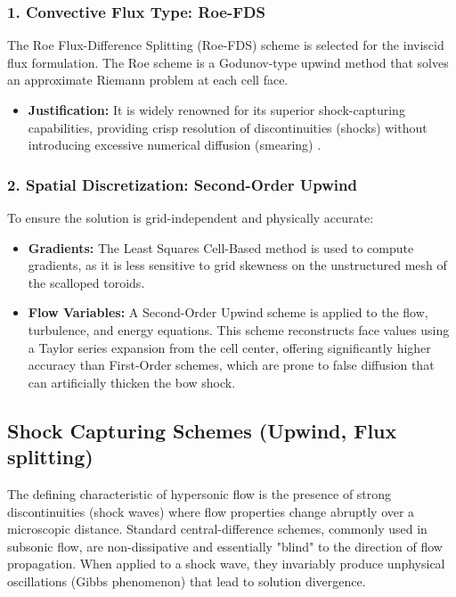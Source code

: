 \subsubsection*{1. Convective Flux Type: Roe-FDS}
The Roe Flux-Difference Splitting (Roe-FDS) scheme is selected for the inviscid flux formulation. The Roe scheme is a Godunov-type upwind method that solves an approximate Riemann problem at each cell face.
\begin{itemize}
    \item \textbf{Justification:} It is widely renowned for its superior shock-capturing capabilities, providing crisp resolution of discontinuities (shocks) without introducing excessive numerical diffusion (smearing) \cite{versteeg2007cfd}.
\end{itemize}

\subsubsection*{2. Spatial Discretization: Second-Order Upwind}
To ensure the solution is grid-independent and physically accurate:
\begin{itemize}
    \item \textbf{Gradients:} The Least Squares Cell-Based method is used to compute gradients, as it is less sensitive to grid skewness on the unstructured mesh of the scalloped toroids.
    \item \textbf{Flow Variables:} A Second-Order Upwind scheme is applied to the flow, turbulence, and energy equations. This scheme reconstructs face values using a Taylor series expansion from the cell center, offering significantly higher accuracy than First-Order schemes, which are prone to false diffusion that can artificially thicken the bow shock.
\end{itemize}


\subsection{Shock Capturing Schemes (Upwind, Flux splitting)}
The defining characteristic of hypersonic flow is the presence of strong discontinuities (shock waves) where flow properties change abruptly over a microscopic distance. Standard central-difference schemes, commonly used in subsonic flow, are non-dissipative and essentially "blind" to the direction of flow propagation. When applied to a shock wave, they invariably produce unphysical oscillations (Gibbs phenomenon) that lead to solution divergence.


